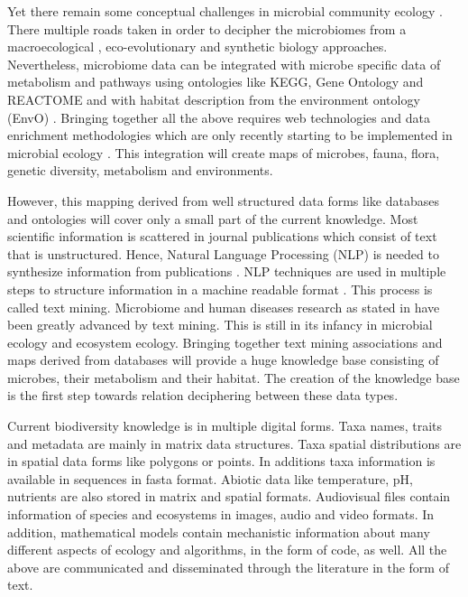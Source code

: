 Yet there remain some conceptual challenges in microbial community ecology \parencite{prosser2020Conceptual}.
There multiple roads taken in order to decipher the microbiomes from a macroecological \parencite{Mascarenhas2020}, 
eco-evolutionary \parencite{martiny2023Investigating, loreau2023Opportunities}
and synthetic biology \parencite{Leggieri2021} approaches.
Nevertheless, microbiome data can be integrated with microbe
specific data of metabolism and pathways using ontologies like KEGG, Gene
Ontology and REACTOME and with habitat description from the environment
ontology (EnvO) \parencite{buttigieg2016environment}. Bringing together all the above requires web technologies and
data enrichment methodologies which are only recently starting to be
implemented in microbial ecology \parencite{jiang2016Microbiome}. This integration
will create maps of microbes, fauna, flora, genetic diversity, metabolism and environments. 

However, this mapping derived from well structured data forms like databases
and ontologies will cover only a small part of the current knowledge. Most
scientific information is scattered in journal publications which consist of
text that is unstructured. Hence, Natural Language Processing (NLP) is needed to synthesize
information from publications \parencite{jensen2006Literature,}.
NLP techniques are used in multiple steps to structure information in a machine readable 
format \parencite{10.5555/1199003}. This process is called text mining.
Microbiome and
human diseases research as stated in \parencite{badal2019Challenges} have been
greatly advanced by text mining. This is still in its infancy in microbial
ecology and ecosystem ecology. Bringing together text mining associations and maps derived from
databases will provide a huge knowledge base consisting of microbes, their
metabolism and their habitat. The creation of the knowledge base is the first
step towards relation deciphering between these data types.

Current biodiversity knowledge is in multiple digital forms. 
Taxa names, traits and metadata are mainly in matrix data
structures. Taxa spatial distributions are in spatial data
forms like polygons or points. In additions taxa information
is available in sequences in fasta format. Abiotic data like 
temperature, pH, nutrients are also stored in matrix
and spatial formats. Audiovisual files contain information
of species and ecosystems in images, audio and video formats.
In addition, mathematical models contain mechanistic information
about many different aspects of ecology and algorithms, in the 
form of code, as well. All the above are communicated and disseminated through the
literature in the form of text.


